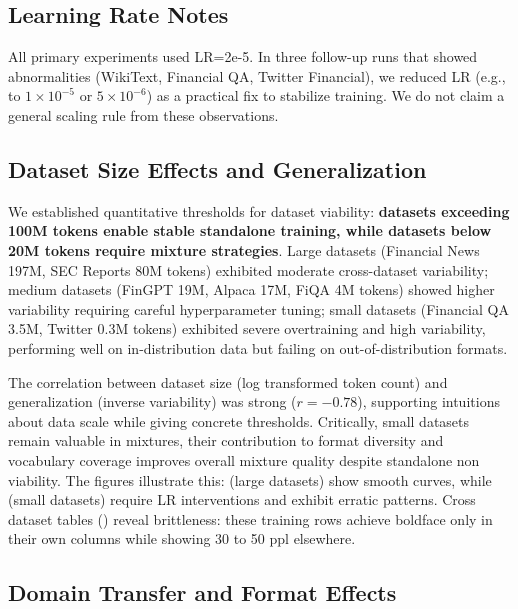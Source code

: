 \subsection{Learning Rate Notes}

All primary experiments used LR=2e-5. In three follow-up runs that showed abnormalities (WikiText, Financial QA, Twitter Financial), we reduced LR (e.g., to $1\times10^{-5}$ or $5\times10^{-6}$) as a practical fix to stabilize training. We do not claim a general scaling rule from these observations.

\subsection{Dataset Size Effects and Generalization}

We established quantitative thresholds for dataset viability: \textbf{datasets exceeding 100M tokens enable stable standalone training, while datasets below 20M tokens require mixture strategies}. Large datasets (Financial News 197M, SEC Reports 80M tokens) exhibited moderate cross-dataset variability; medium datasets (FinGPT 19M, Alpaca 17M, FiQA 4M tokens) showed higher variability requiring careful hyperparameter tuning; small datasets (Financial QA 3.5M, Twitter 0.3M tokens) exhibited severe overtraining and high variability, performing well on in-distribution data but failing on out-of-distribution formats.

The correlation between dataset size (log transformed token count) and generalization (inverse variability) was strong ($r = -0.78$), supporting intuitions about data scale while giving concrete thresholds. Critically, small datasets remain valuable in mixtures, their contribution to format diversity and vocabulary coverage improves overall mixture quality despite standalone non viability. The figures illustrate this:  (large datasets) show smooth curves, while  (small datasets) require LR interventions and exhibit erratic patterns. Cross dataset tables () reveal brittleness: these training rows achieve boldface only in their own columns while showing 30 to 50 ppl elsewhere.

\subsection{Domain Transfer and Format Effects}

